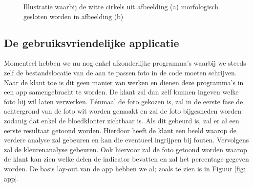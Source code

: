 \documentclass[a4paper,kulak]{kulakarticle}
\begin{document}
\begin{figure}[H]
	\centering
	\qquad
	
	\caption{Illustratie waarbij de witte cirkels uit afbeelding (a) morfologisch gesloten worden in afbeelding (b)}
	\label{figuur morf}
\end{figure}

\subsection{De gebruiksvriendelijke applicatie}
Momenteel hebben we nu nog enkel afzonderlijke programma's waarbij we steeds zelf de bestandslocatie van de aan te passen foto in de code moeten schrijven. Naar de klant toe is dit geen manier van werken en dienen deze programma's in een app samengebracht te worden. De klant zal dan zelf kunnen ingeven welke foto hij wil laten verwerken. Eénmaal de foto gekozen is, zal in de eerste fase de achtergrond van de foto wit worden gemaakt en zal de foto bijgesneden worden zodanig dat enkel de bloedklonter zichtbaar is. Als dit gebeurd is, zal er al een eerste resultaat getoond worden. Hierdoor heeft de klant een beeld waarop de verdere analyse zal gebeuren en kan die eventueel ingrijpen bij fouten. Vervolgens zal de kleurenanalyse gebeuren. Ook hiervoor zal de foto getoond worden waarop de klant kan zien welke delen de indicator bevatten en zal het percentage gegeven worden. De basis lay-out van de app hebben we al; zoals te zien is in Figuur \ref{fig: app}.
\end{document}
